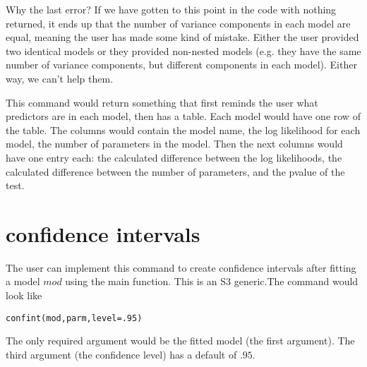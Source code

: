 \documentclass{article}
\begin{document}
Why the last error? If we have gotten to this point in the code with nothing returned, it ends up that the number of variance components in each model are equal, meaning the user has made some kind of mistake. Either the user provided two identical models or they provided non-nested models (e.g. they have the same number of variance components, but different components in each model). Either way, we can't help them.





This command would return something that first reminds the user what predictors are in each model, then has a table. Each model would have one row of the table. The columns would contain the model name,  the log likelihood for each model, the number of parameters in the model. Then the next columns would have one entry each: the calculated difference between the log likelihoods, the calculated difference between the number of parameters, and the pvalue of the test. 



\section{confidence intervals}
The user can implement this command to create confidence intervals after  fitting a model $mod$ using the main function.  This is an S3 generic.The command would look like
\begin{verbatim}
confint(mod,parm,level=.95)
\end{verbatim}
The only required argument would be the fitted model (the first argument). The third argument (the confidence level) has a default of $.95$.
\end{document}
